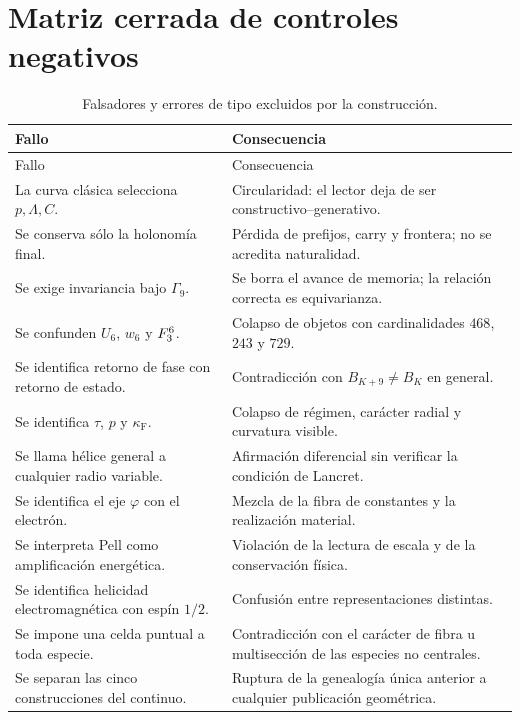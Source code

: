 \section{Matriz cerrada de controles negativos}

\begin{longtable}{p{}p{}}
\caption{Falsadores y errores de tipo excluidos por la construcción.}
\label{espiral:tab:falsadores-ap}\\
\toprule
Fallo&Consecuencia\\
\midrule
\endfirsthead
\toprule
Fallo&Consecuencia\\
\midrule
\endhead
La curva clásica selecciona \(p,\Lambda,C\).&Circularidad: el lector deja
de ser constructivo--generativo.\\
Se conserva sólo la holonomía final.&Pérdida de prefijos, carry y frontera;
no se acredita naturalidad.\\
Se exige invariancia bajo \(\Gamma_9\).&Se borra el avance de memoria; la
relación correcta es equivarianza.\\
Se confunden \(U_6\), \(w_6\) y \(F_3^6\).&Colapso de objetos con
cardinalidades \(468\), \(243\) y \(729\).\\
Se identifica retorno de fase con retorno de estado.&Contradicción con
\(B_{K+9}\neq B_K\) en general.\\
Se identifica \(\tau\), \(p\) y \(\kappa_{\mathrm{F}}\).&Colapso de régimen,
carácter radial y curvatura visible.\\
Se llama hélice general a cualquier radio variable.&Afirmación diferencial
sin verificar la condición de Lancret.\\
Se identifica el eje \(\varphi\) con el electrón.&Mezcla de la fibra de
constantes y la realización material.\\
Se interpreta Pell como amplificación energética.&Violación de la lectura
de escala y de la conservación física.\\
Se identifica helicidad electromagnética con espín \(1/2\).&Confusión entre
representaciones distintas.\\
Se impone una celda puntual a toda especie.&Contradicción con el carácter
de fibra u multisección de las especies no centrales.\\
Se separan las cinco construcciones del continuo.&Ruptura de la genealogía
única anterior a cualquier publicación geométrica.\\
\bottomrule
\end{longtable}

